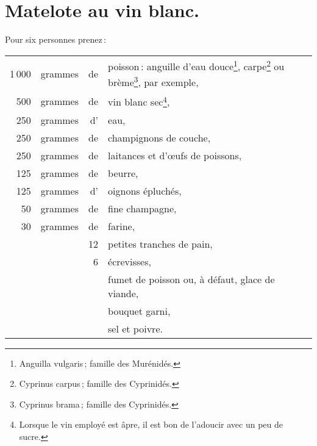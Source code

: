 \section*{\centering Matelote au vin blanc.}

Pour six personnes prenez :

\medskip

\footnotesize
\begin{longtable}{rrrp{16em}}
  1 000 & grammes & de & poisson : anguille d'eau douce\footnote{Anguilla vulgaris ;
                                                        famille des Murénidés.},
                                                        carpe\footnote{Cyprinus carpus ;
                                                        famille des Cyprinidés.} ou
                                                        brème\footnote{Cyprinus brama ;
                                                        famille des Cyprinidés.}, par exemple,            \\
    500 & grammes & de & vin blanc sec\footnote{Lorsque le vin employé est âpre, il est bon
                                                        de l'adoucir avec un peu de sucre.},              \\
    250 & grammes & d' & eau,                                                                             \\
    250 & grammes & de & champignons de couche,                                                           \\
    250 & grammes & de & laitances et d'œufs de poissons,                                                 \\
    125 & grammes & de & beurre,                                                                          \\
    125 & grammes & d' & oignons épluchés,                                                                \\
     50 & grammes & de & fine champagne,                                                                  \\
     30 & grammes & de & farine,                                                                          \\
        &         & 12 & petites tranches de pain,                                                        \\
        &         &  6 & écrevisses,                                                                      \\
        &         &    & fumet de poisson ou, à défaut, glace de viande,                                  \\
        &         &    & bouquet garni,                                                                   \\
        &         &    & sel et poivre.                                                                   \\
\end{longtable}
\normalsize

